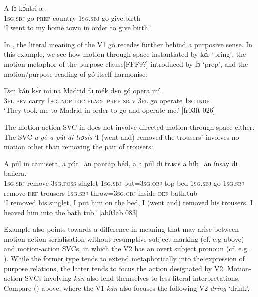\ea%
    \label{ex:key:1558}
    \gll A      fɔ  kɔ́ntri  a      .\\
\textsc{1sg.sbj}  go  \textsc{prep}  country  \textsc{1sg.sbj}  go  give.birth\\

\glt ‘I went to my home town in order to give birth.’
\z

In , the literal meaning of the V1 gó recedes further behind a purposive sense. In this example, we see how motion through space instantiated by kɛ́r ‘bring’, the motion metaphor of the purpose clause[FFF9?] introduced by fɔ ‘prep’, and the motion/purpose reading of gó itself harmonise:


\ea%
    \label{ex:key:1559}
    \gll Dɛn  kán  kɛ́r    mí    na  Madrid  fɔ  mék    dɛn  gó  opera  mí.\\
\textsc{3pl}  \textsc{pfv}  carry  \textsc{1sg.indp}  \textsc{loc}  \textsc{place}  \textsc{prep}  \textsc{sbjv}    \textsc{3pl}  go  operate  \textsc{1sg.indp}\\

\glt ‘They took me to Madrid in order to go and operate me.’ [fr03ft 026]
\z

The motion-action SVC in  does not involve directed motion through space either. The SVC \textit{a gó a púl di trɔsis} ‘I (went and) removed the trousers’ involves no motion other than removing the pair of trousers:


\ea%
    \label{ex:key:1560}
    \gll A    púl    in    camiseta,  a    pút=an    pantáp  béd,
a      a    púl    di  trɔsis  a    híb=an
ínsay  di  bañera.\\
\textsc{1sg.sbj}  remove  \textsc{3sg.poss}  singlet    \textsc{1sg.sbj}  put=\textsc{3sg.obj}  top    bed
\textsc{1sg.sbj}  go  \textsc{1sg.sbj}  remove  \textsc{def}  trousers  \textsc{1sg.sbj}  throw=\textsc{3sg.obj}
inside  \textsc{def}  bath.tub\\

\glt ‘I removed his singlet, I put him on the bed, I (went and) removed his trousers, 
I heaved him into the bath tub.’ [ab03ab 083]
\z

Example  also points towards a difference in meaning that may arise between motion-action serialisation without resumptive subject marking (cf. e.g  above) and motion-action SVCs, in which the V2 has an overt subject pronoun (cf. e.g. ). While the former type tends to extend metaphorically into the expression of purpose relations, the latter tends to focus the action designated by V2. Motion-action SVCs involving \textit{kán} also lend themselves to less literal interpretations. Compare () above, where the V1 \textit{kán} also focuses the following V2 \textit{dríng} ‘drink’. 

